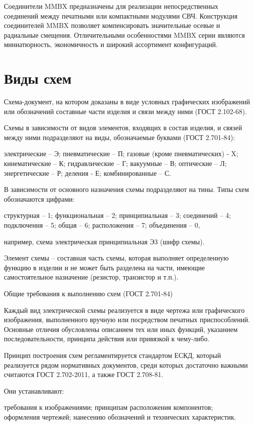 \documentclass[%
	11pt,
	a4paper,
	utf8,
		]{article}
\begin{document}
Соединители MMBX предназначены для реализации непосредственных соединений между печатными или компактными модулями СВЧ. Конструкция соединителей MMBX позволяет компенсировать значительные осевые и радиальные смещения. Отличительными особенностями MMBX серии являются миниатюрность, экономичность и широкий ассортимент конфигураций.

\section{Виды схем}

 Схема-документ, на котором доказаны в виде условных графических изображений или обозначений составные части изделия и связи между ними (ГОСТ 2.102-68).

Схемы в зависимости от видов элементов, входящих в состав изделия, и связей между ними подразделяют на виды, обозначаемые буквами (ГОСТ 2.701-84):

электрические – Э; пневматические – П; газовые (кроме пневматических) - X; кинематические – К; гидравлические – Г; вакуумные – В; оптические – Л; энергетические – Р; деления - Е; комбинированные – С.

В зависимости от основного назначения схемы подразделяют на тины. Типы схем обозначаются цифрами:

структурная – 1; функциональная – 2; принципиальная – 3; соединений – 4; подключения – 5; общая – 6; расположения – 7; объединения – 0,

например, схема электрическая принципиальная Э3 (шифр схемы).

Элемент схемы – составная часть схемы, которая выполняет определенную функцию в изделии и не может быть разделена на части, имеющие самостоятельное назначение (резистор, транзистор и т.п.).

Общие требования к выполнению схем (ГОСТ 2.701-84)

Каждый вид электрической схемы реализуется в виде чертежа или графического изображения, выполненного вручную или посредством печатных приспособлений. Основные отличия обусловлены описанием тех или иных функций, указанием последовательности, принципа действия или привязкой к чему-либо.

Принцип построения схем регламентируется стандартом ЕСКД, который реализуется рядом нормативных документов, среди которых достаточно важными считаются ГОСТ 2.702-2011, а также ГОСТ 2.708-81.

Они устанавливают:

требования к изображениями;
принципам расположения компонентов;
оформления чертежей;
нанесению обозначений и технических характеристик.
\end{document}

